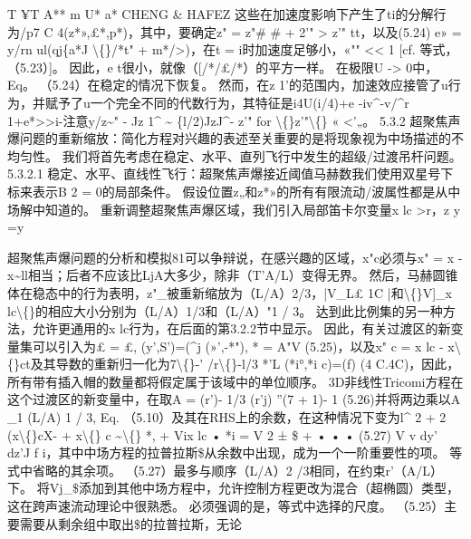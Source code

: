 \documentclass[UTF8,11pt,a4paper,openany,fontset=fandol]{ctexbook}
\begin{document}
T ¥T A** m U* a* CHENG \& HAFEZ 这些在加速度影响下产生了ti的分解行为/p7 C 4(z*»,£*,p*)，其中，要确定z" = z"\# \# + 2'" > z'" tt，以及(5.24) e» = y/rn ul(qj\{a*J \textbackslash\{\}/*t" + m*/>)，在t = i时加速度足够小，«"" << 1 [cf. 等式，（5.23）]。 因此，e t很小，就像（[/*/£/*）的平方一样。 在极限U -> 0中，Eq。 （5.24）在稳定的情况下恢复。 然而，在z 1'的范围内，加速效应接管了u行为，并赋予了u一个完全不同的代数行为，其特征是i4U(i/4)+e -iv\textasciicircum{}-v/\textasciicircum{}r 1+e*>>i-注意y/z\textasciitilde{}" - Jz 1\textasciicircum{} \textasciitilde{} \{l/2)JzJ\textasciicircum{}- z'" for \textbackslash\{\}z'"\textbackslash\{\} « <'„。 5.3.2 超聚焦声爆问题的重新缩放：简化方程对兴趣的表述至关重要的是将现象视为中场描述的不均匀性。 我们将首先考虑在稳定、水平、直列飞行中发生的超级/过渡吊杆问题。 5.3.2.1 稳定、水平、直线性飞行：超聚焦声爆接近阈值马赫数我们使用双星号下标来表示B 2 = 0的局部条件。 假设位置z„和z*»的所有有限流动/波属性都是从中场解中知道的。 重新调整超聚焦声爆区域，我们引入局部笛卡尔变量x lc >r，z y =y

超聚焦声爆问题的分析和模拟81可以争辩说，在感兴趣的区域，x"c必须与x" = x - x\textasciitilde{}ll相当；后者不应该比LjA大多少，除非（T'A/L）变得无界。 然后，马赫圆锥体在稳态中的行为表明，z"\_被重新缩放为（L/A）2/3，|V\_L£ 1C |和\textbackslash\{\}V]\_x lc\textbackslash\{\}的相应大小分别为（L/A）1/3和（L/A）"1 / 3。 达到此比例集的另一种方法，允许更通用的x lc行为，在后面的第3.2.2节中显示。 因此，有关过渡区的新变量集可以引入为£ = £, (y',S')=(\textasciicircum{}j (»',-*"), * = A"V (5.25)，以及x" c = x lc - x\textbackslash\{\}ct及其导数的重新归一化为7\textbackslash\{\}-' /r\textbackslash\{\}-l/3 *'L (*i°,*i c)=(f) (4 C.4C)，因此，所有带有插入帽的数量都将假定属于该域中的单位顺序。 3D非线性Tricomi方程在这个过渡区的新变量中，在取A = (r')- 1/3 (r'j) ''(7 + 1)- 1 (5.26)并将两边乘以A \_1 (L/A) 1 / 3, Eq. （5.10）及其在RHS上的余数，在这种情况下变为l\textasciicircum{} 2 + 2 (x\textbackslash\{\}cX- + x\textbackslash\{\} c \textasciitilde{}\textbackslash\{\} *, + Vix lc • *i = V 2 ± \$ + • • • (5.27) V v dy' dz'J f i，其中中场方程的拉普拉斯\$从余数中出现，成为一个一阶重要性的项。 等式中省略的其余项。 （5.27）最多与顺序（L/A）2 /3相同，在约束r'（A/L）下。 将Vj\_\$添加到其他中场方程中，允许控制方程更改为混合（超椭圆）类型，这在跨声速流动理论中很熟悉。 必须强调的是，等式中选择的尺度。 （5.25）主要需要从剩余组中取出\$的拉普拉斯，无论
\end{document}
